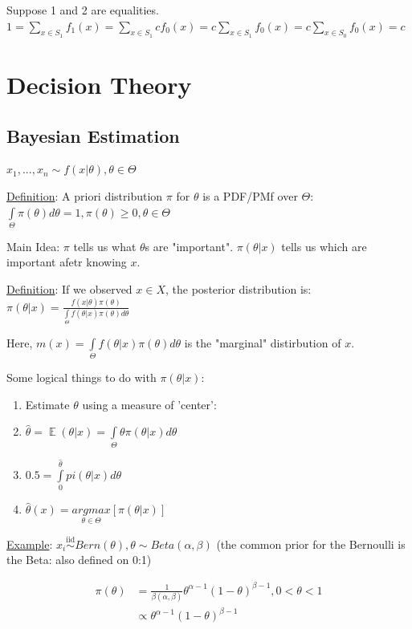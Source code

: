 \documentclass{article}
\DeclareMathOperator{\EX}{\mathbb{E}} %
\let\Oldint=\int
\let\Oldsum=\sum
\renewcommand{\int}{\Oldint\limits}
\renewcommand{\sum}{\Oldsum\limits}
\newcommand{\iiddist}{\overset{\mathrm{iid}}{\sim}}
\begin{document}
Suppose 1 and 2 are equalities. $1 = \sum_{x \in S_1}f_1(x) = \sum_{x \in S_1}c f_0(x) = c \sum_{x \in S_1} f_0(x) = c \sum_{x \in S_0} f_0(x) = c$

\newpage
\section{Decision Theory}

\subsection{Bayesian Estimation}
$x_1, ..., x_n \sim f(x|\theta), \theta \in \Theta$

\underline{Definition}: A priori distribution $\pi$ for $\theta$ is a PDF/PMf over $\Theta$: $\int_{\Theta} \pi(\theta)d\theta = 1, \pi(\theta) \ge 0, \theta \in \Theta$

Main Idea: $\pi$ tells us what $\theta$s are "important". $\pi(\theta|x)$ tells us which are important afetr knowing $x$.

\underline{Definition}: If we observed $x \in X$, the posterior distribution is: $\pi(\theta|x) = \frac{f(x|\theta)\pi(\theta)}{\int_{\Theta} f(\theta|x)\pi(\theta)d\theta}$

Here, $m(x) = \int_{\Theta} f(\theta|x)\pi(\theta)d\theta$ is the "marginal" distirbution of $x$. 

Some logical things to do with $\pi(\theta|x)$:
\begin{enumerate}
    \item Estimate $\theta$ using a measure of 'center':
    \item  $\hat{\theta} = \EX(\theta|x) = \int_{\Theta} \theta \pi(\theta|x)d\theta$
    \item $0.5 = \int_0^{\hat{\theta}}pi(\theta|x)d\theta$
    \item $\hat{\theta}(x) = \underset{\theta \in \Theta}{argmax} [\pi(\theta|x)]$
\end{enumerate}

\underline{Example}: 
$x_i \iiddist Bern(\theta), \theta \sim Beta(\alpha, \beta)$ (the common prior for the Bernoulli is the Beta: also defined on 0:1)

$$
\begin{aligned}
\pi(\theta) 
&= \frac{1}{\beta(\alpha, \beta)}\theta^{\alpha-1}(1-\theta)^{\beta - 1}, 0<\theta<1 \\
&\propto \theta^{\alpha-1}(1-\theta)^{\beta - 1}
\end{aligned}
$$
\end{document}
